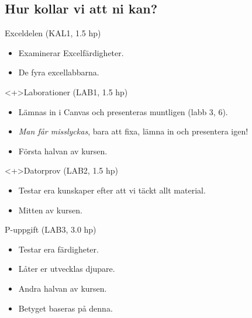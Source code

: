 \subsection{Hur kollar vi att ni kan?}

\begin{frame}
  \begin{block}{Exceldelen (KAL1, 1.5 hp)}
    \begin{itemize}
      \item Examinerar Excelfärdigheter.
      \item De fyra excellabbarna.
    \end{itemize}
  \end{block}
\end{frame}

\begin{frame}
  \begin{block}<+>{Laborationer (LAB1, 1.5 hp)}
    \begin{itemize}
      \item Lämnas in i Canvas och presenteras muntligen (labb 3, 6).
      \item \emph{Man får misslyckas}, bara att fixa, lämna in och presentera 
        igen!
      \item Första halvan av kursen.
    \end{itemize}
  \end{block}

  \begin{block}<+>{Datorprov (LAB2, 1.5 hp)}
    \begin{itemize}
      \item Testar era kunskaper efter att vi täckt allt material.
      \item Mitten av kursen.
    \end{itemize}
  \end{block}
\end{frame}

\begin{frame}
  \begin{block}{P-uppgift (LAB3, 3.0 hp)}
    \begin{itemize}
      \item Testar era färdigheter.
      \item Låter er utvecklas djupare.
      \item Andra halvan av kursen.
      \item Betyget baseras på denna.
    \end{itemize}
  \end{block}
\end{frame}


